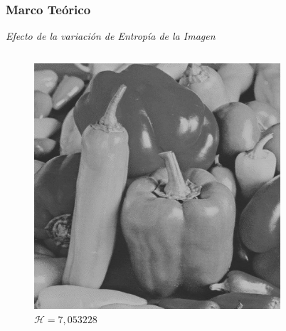 \documentclass[usenames,dvipsnames]{beamer}
\begin{document}
\begin{frame} 
\frametitle{Marco Teórico} 
\begin{exampleblock}{\textit{Efecto de la variación de Entropía de la Imagen}}

\end{exampleblock}

\centering
\begin{columns}[onlytextwidth]
\begin{column}{.45\textwidth}
\begin{figure}
  \includegraphics[width=\textwidth]{graphics/peppers_gray_lc.jpg}
  \caption{$\mathscr{H}=7,053228$}
\end{figure}
\end{column}
\hfill
\begin{column}{.45\textwidth}
		\begin{figure}

\end{figure}
\end{column}
\end{columns}
\end{frame}
\end{document}
